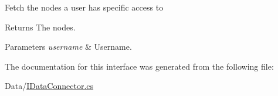 Fetch the nodes a user has specific access to 

\begin{DoxyReturn}{Returns}
The nodes.
\end{DoxyReturn}

\begin{DoxyParams}{Parameters}
{\em username} & Username.\\
\hline
\end{DoxyParams}


The documentation for this interface was generated from the following file\+:\begin{DoxyCompactItemize}
\item 
Data/\hyperlink{_i_data_connector_8cs}{I\+Data\+Connector.\+cs}\end{DoxyCompactItemize}
